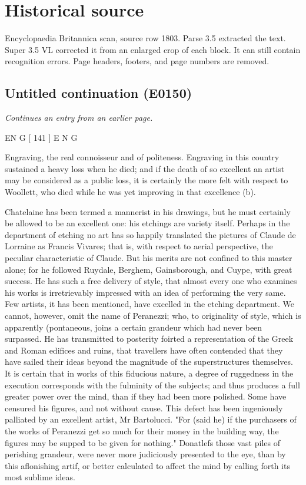 \documentclass{article}
\begin{document}
\section*{Historical source}
Encyclopaedia Britannica scan, source row 1803. Parse 3.5 extracted the text. Super 3.5 VL corrected it from an enlarged crop of each block. It can still contain recognition errors.
Page headers, footers, and page numbers are removed.

\subsection*{Untitled continuation (E0150)}
\textit{Continues an entry from an earlier page.}

EN G [ 141 ] E N G

Engraving, the real connoisseur and of politeness. Engraving in this country sustained a heavy loss when he died; and if the death of so excellent an artist may be considered as a public loss, it is certainly the more felt with respect to Woollett, who died while he was yet improving in that excellence (b).

Chatelaine has been termed a mannerist in his drawings, but he must certainly be allowed to be an excellent one: his etchings are variety itself. Perhaps in the department of etching no art has so happily translated the pictures of Claude de Lorraine as Francis Vivares; that is, with respect to aerial perspective, the peculiar characteristic of Claude. But his merits are not confined to this master alone; for he followed Ruydale, Berghem, Gainsborough, and Cuype, with great success. He has such a free delivery of style, that almost every one who examines his works is irretrievably impressed with an idea of performing the very same. Few artists, it has been mentioned, have excelled in the etching department. We cannot, however, omit the name of Peranezzi; who, to originality of style, which is apparently (pontaneous, joins a certain grandeur which had never been surpassed. He has transmitted to posterity foirted a representation of the Greek and Roman edifices and ruins, that travellers have often contended that they have sailed their ideas beyond the magnitude of the superstructures themselves. It is certain that in works of this fiducious nature, a degree of ruggedness in the execution corresponds with the fulminity of the subjects; and thus produces a full greater power over the mind, than if they had been more polished. Some have censured his figures, and not without cause. This defect has been ingeniously palliated by an excellent artist, Mr Bartolucci. "For (said he) if the purchasers of the works of Peranezzi get so much for their money in the building way, the figures may be supped to be given for nothing." Donatlefs those vast piles of perishing grandeur, were never more judiciously presented to the eye, than by this aflonishing artif, or better calculated to affect the mind by calling forth its most sublime ideas.
\end{document}
